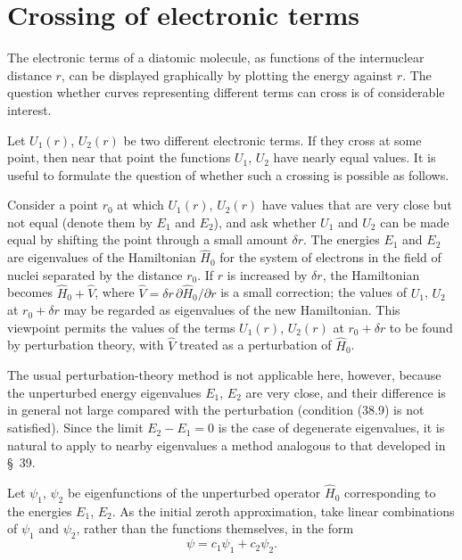 \section{Crossing of electronic terms}

The electronic terms of a diatomic molecule, as functions of the internuclear distance $r$, can be displayed graphically by plotting the energy against $r$. The question whether curves representing different terms can cross is of considerable interest.

Let $U_1(r)$, $U_2(r)$ be two different electronic terms. If they cross at some point, then near that point the functions $U_1$, $U_2$ have nearly equal values. It is useful to formulate the question of whether such a crossing is possible as follows.

Consider a point $r_0$ at which $U_1(r)$, $U_2(r)$ have values that are very close but not equal (denote them by $E_1$ and $E_2$), and ask whether $U_1$ and $U_2$ can be made equal by shifting the point through a small amount $\delta r$. The energies $E_1$ and $E_2$ are eigenvalues of the Hamiltonian $\widehat H_0$ for the system of electrons in the field of nuclei separated by the distance $r_0$. If $r$ is increased by $\delta r$, the Hamiltonian becomes $\widehat H_0+\widehat V$, where $\widehat V=\delta r\,\partial\widehat H_0/\partial r$ is a small correction; the values of $U_1$, $U_2$ at $r_0+\delta r$ may be regarded as eigenvalues of the new Hamiltonian. This viewpoint permits the values of the terms $U_1(r)$, $U_2(r)$ at $r_0+\delta r$ to be found by perturbation theory, with $\widehat V$ treated as a perturbation of $\widehat H_0$.

The usual perturbation-theory method is not applicable here, however, because the unperturbed energy eigenvalues $E_1$, $E_2$ are very close, and their difference is in general not large compared with the perturbation (condition (38.9) is not satisfied). Since the limit $E_2-E_1=0$ is the case of degenerate eigenvalues, it is natural to apply to nearby eigenvalues a method analogous to that developed in \S~39.

Let $\psi_1$, $\psi_2$ be eigenfunctions of the unperturbed operator $\widehat H_0$ corresponding to the energies $E_1$, $E_2$. As the initial zeroth approximation, take linear combinations of $\psi_1$ and $\psi_2$, rather than the functions themselves, in the form
\begin{equation}
 \psi=c_1\psi_1+c_2\psi_2.
 \tag{79.1}
\end{equation}

